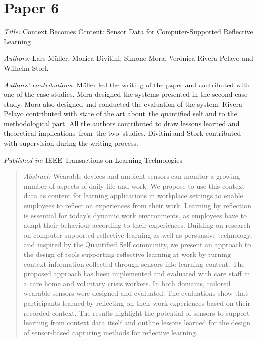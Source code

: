 \section[Context Becomes Content: Sensor Data for Computer-Supported Reflective Learning]{Paper 6}\label{paper-6}

\emph{Title:} Context Becomes Content: Sensor Data for Computer-Supported Reflective Learning

\emph{Authors:} Lars Müller, Monica Divitini, Simone Mora, Verónica Rivera-Pelayo and Wilhelm Stork

\emph{Authors' contributions:} Müller led the writing of the paper and contributed with one of the case studies. Mora designed the systems presented in the second case study. Mora also designed and conducted the evaluation of the system. Rivera-Pelayo contributed with state of the art about~the quantified self and to the methodological part. All the authors contributed to draw lessons learned and theoretical implications~from~the two~studies. Divitini and Stork contributed with supervision during the writing process.

\emph{Published in:} IEEE Transactions on Learning Technologies
\begin{quote}
	\emph{Abstract:} Wearable devices and ambient sensors can monitor a growing number of aspects of daily life and work. We propose to use this context data as content for learning applications in workplace settings to enable employees to reflect on experiences from their work. Learning by reflection is essential for today's dynamic work environments, as employees have to adapt their behaviour according to their experiences. Building on research on computer-supported reflective learning as well as persuasive technology, and inspired by the Quantified Self community, we present an approach to the design of tools supporting reflective learning at work by turning context information collected through sensors into learning content. The proposed approach has been implemented and evaluated with care staff in a care home and voluntary crisis workers. In both domains, tailored wearable sensors were designed and evaluated. The evaluations show that participants learned by reflecting on their work experiences based on their recorded context. The results highlight the potential of sensors to support learning from context data itself and outline lessons learned for the design of sensor-based capturing methods for reflective learning. 
\end{quote}

